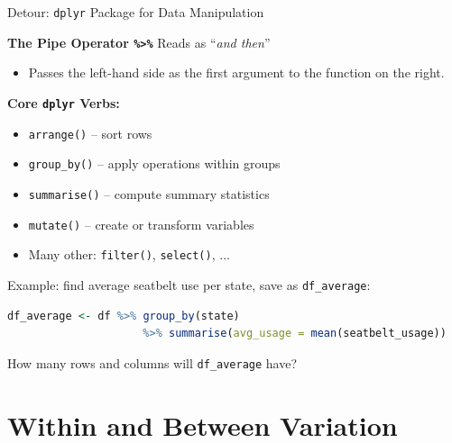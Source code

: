 \documentclass[9pt,aspectratio=169]{beamer}
\begin{document}
\begin{frame}[fragile]{Detour: \texttt{dplyr} Package for Data Manipulation}
\linespread{1.3}\selectfont %

\textbf{The Pipe Operator \texttt{\%>\%}} Reads as “\textit{and then}”
\vspace{-0.15cm}
\begin{itemize}
    \item Passes the left-hand side as the first argument to the function on the right.
\end{itemize}
\pause
\textbf{Core \texttt{dplyr} Verbs:}
\vspace{-0.15cm}
\begin{itemize}
    \item \texttt{arrange()} – sort rows
    \item \texttt{group\_by()} – apply operations within groups
    \item \texttt{summarise()} – compute summary statistics
    \item \texttt{mutate()} – create or transform variables
    \item Many other: \texttt{filter()}, \texttt{select()}, ...
\end{itemize}
\pause
Example: find average seatbelt use per state, save as \texttt{df\_average}:
\begin{lstlisting}[language=R]
    df_average <- df %>% group_by(state) 
                     %>% summarise(avg_usage = mean(seatbelt_usage))
\end{lstlisting}
\pause
\vspace{-0.2cm}
\begin{center}
    How many rows and columns will \texttt{df\_average} have? 
\end{center}
\end{frame}

\section{Within and Between Variation}
\end{document}
